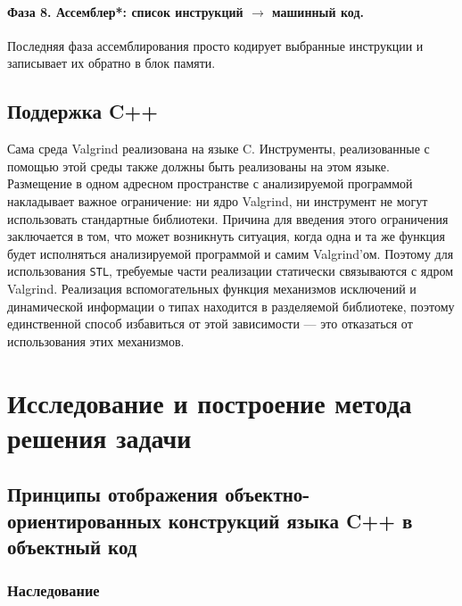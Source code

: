 \documentclass[a4paper,12pt,russian]{article}
\begin{document}
\paragraph{Фаза 8. Ассемблер*: список инструкций $\to$ машинный код.}
Последняя фаза ассемблирования просто кодирует выбранные инструкции и записывает их обратно в блок памяти.

\subsection{Поддержка C++}
Сама среда Valgrind реализована на языке C. Инструменты, реализованные с помощью этой среды также должны быть реализованы на этом языке.
Размещение в одном адресном пространстве с анализируемой программой накладывает важное ограничение: ни ядро Valgrind, ни инструмент не могут использовать стандартные библиотеки.
Причина для введения этого ограничения заключается в том, что может возникнуть ситуация, когда одна и та же функция будет исполняться анализируемой программой и самим Valgrind'ом.
Поэтому для использования \texttt{STL}, требуемые части реализации статически связываются с ядром Valgrind.
Реализация вспомогательных функция механизмов исключений и динамической информации о типах находится в разделяемой библиотеке, поэтому единственной способ избавиться от этой зависимости --- это отказаться от использования этих механизмов.

\newpage
\section{Исследование и построение метода решения задачи}
\subsection{Принципы отображения объектно-ориентированных конструкций языка C++ в объектный код}
\subsubsection{Наследование}
\end{document}
